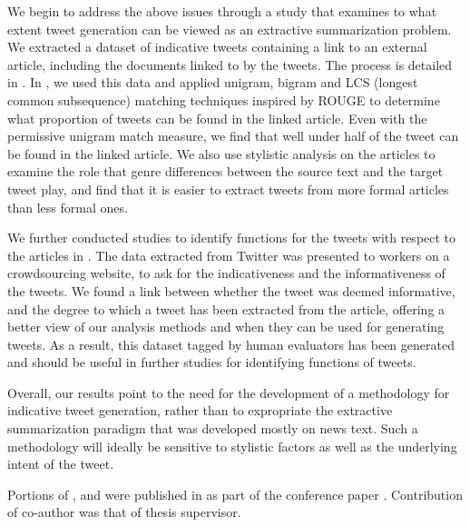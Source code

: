 We begin to address the above issues through a study that examines to what extent tweet generation can be viewed as an extractive summarization problem. We extracted a dataset of indicative tweets containing a link to an external article, including the documents linked to by the tweets. The process is detailed in . In , we used this data and applied unigram, bigram and LCS (longest common subsequence) matching techniques inspired by ROUGE to determine what proportion of tweets can be found in the linked article. Even with the permissive unigram match measure, we find that well under half of the tweet can be found in the linked article. We also use stylistic analysis on the articles to examine the role that genre differences between the source text and the target tweet play, and find that it is easier to extract tweets from more formal articles than less formal ones. 

We further conducted studies to identify functions for the tweets with respect to the articles in . The data extracted from Twitter was presented to workers on a crowdsourcing website, to ask for the indicativeness and the informativeness of the tweets. We found a link between whether the tweet was deemed informative, and the degree to which a tweet has been extracted from the article, offering a better view of our analysis methods and when they can be used for generating tweets. As a result, this dataset tagged by human evaluators has been generated and should be useful in further studies for identifying functions of tweets.

Overall, our results point to the need for the development of a methodology for indicative tweet generation, rather than to expropriate the extractive summarization paradigm that was developed mostly on news text. Such a methodology will ideally be sensitive to stylistic factors as well as the underlying intent of the tweet.

Portions of ,  and  were published in as part of the conference paper \cite{sidhayeindicative}. Contribution of co-author was that of thesis supervisor. 
